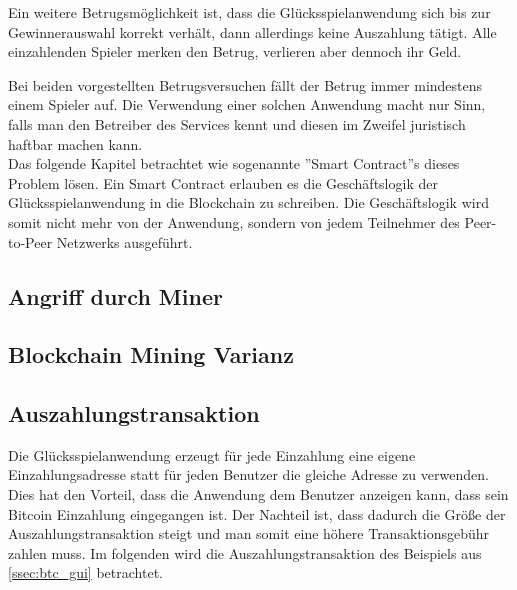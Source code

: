 Ein weitere Betrugsmöglichkeit ist, dass die Glücksspielanwendung sich bis zur Gewinnerauswahl korrekt verhält, dann allerdings keine Auszahlung tätigt. Alle einzahlenden Spieler merken den Betrug, verlieren aber dennoch ihr Geld.

Bei beiden vorgestellten Betrugsversuchen fällt der Betrug immer mindestens einem Spieler auf. Die Verwendung einer solchen Anwendung macht nur Sinn, falls man den Betreiber des Services kennt und diesen im Zweifel juristisch haftbar machen kann.\\
Das folgende Kapitel betrachtet wie sogenannte ''Smart Contract''s dieses Problem lösen. Ein Smart Contract erlauben es die Geschäftslogik der Glücksspielanwendung in die Blockchain zu schreiben. Die Geschäftslogik wird somit nicht mehr von der Anwendung, sondern von jedem Teilnehmer des Peer-to-Peer Netzwerks ausgeführt. 


\subsection{Angriff durch Miner}


\subsection{Blockchain Mining Varianz}


\subsection{Auszahlungstransaktion}
Die Glücksspielanwendung erzeugt für jede Einzahlung eine eigene Einzahlungsadresse statt für jeden Benutzer die gleiche Adresse zu verwenden. Dies hat den Vorteil, dass die Anwendung dem Benutzer anzeigen kann, dass sein Bitcoin Einzahlung eingegangen ist. Der Nachteil ist, dass dadurch die Größe der Auszahlungstransaktion steigt und man somit eine höhere Transaktionsgebühr zahlen muss. Im folgenden wird die Auszahlungstransaktion des Beispiels aus \ref{ssec:btc_gui} betrachtet.

